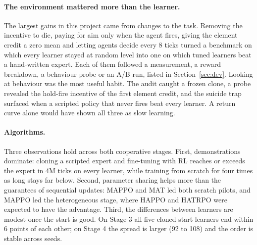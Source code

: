 \documentclass[11pt]{article}
\begin{document}
\paragraph{The environment mattered more than the learner.} The largest gains in this project came from changes to the task. Removing the incentive to die, paying for aim only when the agent fires, giving the element credit a zero mean and letting agents decide every 8 ticks turned a benchmark on which every learner stayed at random level into one on which tuned learners beat a hand-written expert. Each of them followed a measurement, a reward breakdown, a behaviour probe or an A/B run, listed in Section~\ref{sec:dev}. Looking at behaviour was the most useful habit. The audit caught a frozen clone, a probe revealed the hold-fire incentive of the first element credit, and the suicide trap surfaced when a scripted policy that never fires beat every learner. A return curve alone would have shown all three as slow learning.

\paragraph{Algorithms.} Three observations hold across both cooperative stages. First, demonstrations dominate: cloning a scripted expert and fine-tuning with RL reaches or exceeds the expert in 4M ticks on every learner, while training from scratch for four times as long stays far below. Second, parameter sharing helps more than the guarantees of sequential updates: MAPPO and MAT led both scratch pilots, and MAPPO led the heterogeneous stage, where HAPPO and HATRPO were expected to have the advantage. Third, the differences between learners are modest once the start is good. On Stage 3 all five cloned-start learners end within 6 points of each other; on Stage 4 the spread is larger (92 to 108) and the order is stable across seeds.
\end{document}
